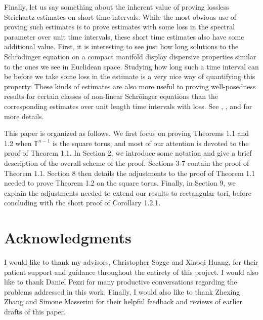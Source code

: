 \documentclass[11pt]{amsart}
\numberwithin{equation}{section}
\newcommand{\Tn}{\mathbb{T}^{n-1}}
\begin{document}
Finally, let us say something about the inherent value of proving lossless Strichartz estimates on short time intervals. While the most obvious use of proving such estimates is to prove estimates with some loss in the spectral parameter over unit time intervals, these short time estimates also have some additional value. First, it is interesting to see just how long solutions to the Schr\"{o}dinger equation on a compact manifold display dispersive properties similar to the ones we see in Euclidean space. Studying how long such a time interval can be before we take some loss in the estimate is a very nice way of quantifying this property. These kinds of estimates are also more useful to proving well-posedness results for certain classes of non-linear Schr\"{o}inger equations than the corresponding estimates over unit length time intervals with loss. See \cite{HerrKwak2024}, \cite{McConnell2025ShortTimeStrichartz}, and \cite{Schippa2023Strichartz} for more details.

This paper is organized as follows. We first focus on proving Theorems 1.1 and 1.2 when $\Tn$ is the square torus, and most of our attention is devoted to the proof of Theorem 1.1. In Section 2, we introduce some notation and give a brief description of the overall scheme of the proof. Sections 3-7 contain the proof of Theorem 1.1. Section 8 then details the adjustments to the proof of Theorem 1.1 needed to prove Theorem 1.2 on the square torus. Finally, in Section 9, we explain the adjustments needed to extend our results to rectangular tori, before concluding with the short proof of Corollary 1.2.1.

\section*{Acknowledgments} 
I would like to thank my advisors, Christopher Sogge and Xiaoqi Huang, for their patient support and guidance throughout the entirety of this project. I would also like to thank Daniel Pezzi for many productive conversations regarding the problems addressed in this work. Finally, I would also like to thank Zhexing Zhang and Simone Masserini for their helpful feedback and reviews of earlier drafts of this paper.
\end{document}
